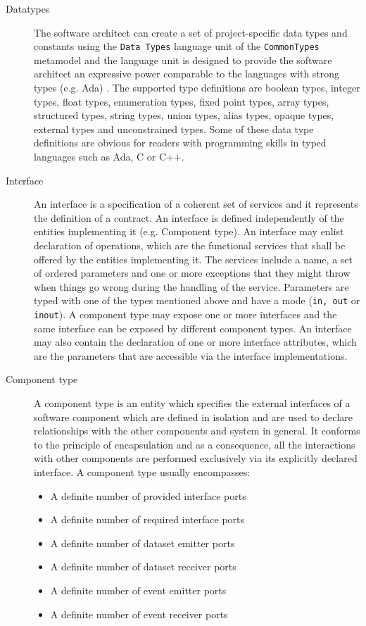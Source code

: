 \begin{description}
\item [Datatypes] The software architect can create a set of project-specific data types and constants using the \texttt{Data Types} language unit of the \texttt{CommonTypes} metamodel and the language unit is designed to provide the software architect an expressive power comparable to the languages with strong types (e.g. Ada) \cite{SpecMetamodel}. The supported type definitions are boolean types, integer types, float types, enumeration types, fixed point types, array types, structured types, string types, union types, alias types, opaque types, external types and unconstrained types. Some of these data type definitions are obvious for readers with programming skills in typed languages such as Ada, C or C++. 

\item [Interface] An interface is a specification of a coherent set of services and it represents the definition of a contract. An interface is defined independently of the entities implementing it (e.g. Component type). An interface may enlist declaration of operations, which are the functional services that shall be offered by the entities implementing it. The services include a name, a set of ordered parameters and one or more exceptions that they might throw when things go wrong during the handling of the service. Parameters are typed with one of the types mentioned above and have a mode (\texttt{in, out} or \texttt{inout}). A component type may expose one or more interfaces and the same interface can be exposed by different component types. An interface may also contain the declaration of one or more interface attributes, which are the parameters that are accessible via the interface implementations.

\item [Component type] A component type is an entity which specifies the external interfaces of a software component which are defined in isolation and are used to declare relationships with the other components and system in general. It conforms to the principle of encapsulation and as a consequence, all the interactions with other components are performed exclusively via its explicitly declared interface. A component type usually encompasses:
\begin{itemize}
\item A definite number of provided interface ports
\item A definite number of required interface ports
\item A definite number of dataset emitter ports 
\item A definite number of dataset receiver ports
\item A definite number of event emitter ports
\item A definite number of event receiver ports 
\end{itemize}


\end{description}

